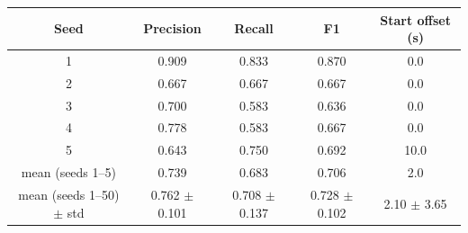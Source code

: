\begin{tabular}{ccccc}
\hline
Seed & Precision & Recall & F1 & Start offset (s) \\
\hline
1 & 0.909 & 0.833 & 0.870 & 0.0 \\
2 & 0.667 & 0.667 & 0.667 & 0.0 \\
3 & 0.700 & 0.583 & 0.636 & 0.0 \\
4 & 0.778 & 0.583 & 0.667 & 0.0 \\
5 & 0.643 & 0.750 & 0.692 & 10.0 \\
\hline
mean (seeds 1--5) & 0.739 & 0.683 & 0.706 & 2.0 \\
mean (seeds 1--50) $\pm$ std & 0.762 $\pm$ 0.101 & 0.708 $\pm$ 0.137 & 0.728 $\pm$ 0.102 & 2.10 $\pm$ 3.65 \\
\hline
\end{tabular}
